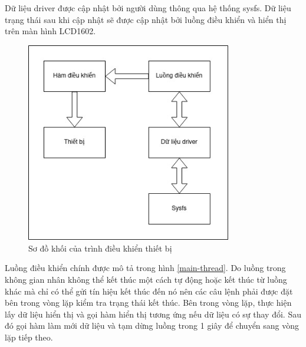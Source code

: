 \documentclass{report}
\begin{document}
Dữ liệu driver được cập nhật bởi người dùng thông qua hệ thống sysfs. Dữ liệu trạng thái sau khi cập nhật sẽ được cập nhật bởi luồng điều khiển và hiển thị trên màn hình LCD1602.

\begin{figure}[H]
	\centering
	\includegraphics[width=0.8\textwidth]{../images/driver.jpg}
	\caption{Sơ đồ khối của trình điều khiển thiết bị}
	\label{driver-block}
\end{figure}

Luồng điều khiển chính được mô tả trong hình \ref{main-thread}. Do luồng trong không gian nhân không thể kết thúc một cách tự động hoặc kết thúc từ luồng khác mà chỉ có thể gửi tín hiệu kết thúc đến nó nên các câu lệnh phải được đặt bên trong vòng lặp kiểm tra trạng thái kết thúc. Bên trong vòng lặp, thực hiện lấy dữ liệu hiển thị và gọi hàm hiển thị tương ứng nếu dữ liệu có sự thay đổi. Sau đó gọi hàm làm mới dữ liệu và tạm dừng luồng trong 1 giây để chuyển sang vòng lặp tiếp theo.
\end{document}
